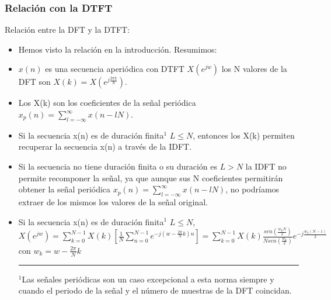 \begin{frame}
\frametitle{Relación con la DTFT}

\footnotesize

\alert{Relación entre la DFT y la DTFT:}

\begin{itemize}
\footnotesize
\item Hemos visto la relación en la introducción. Resumimos:
\item $x(n)$ es una secuencia aperiódica con DTFT $X(e^{jw})$ los N valores de la DFT son $X(k)=X(e^{j\frac{2\pi k}{N}})$.

\item Los X(k) son los coeficientes de la señal periódica $x_p(n)=\sum_{l=-\infty}^{\infty} x(n-lN)$.

\item Si la secuencia x(n) es de duración finita$^{1}$ $L\le N$, entonces los X(k) permiten recuperar la secuencia x(n) a través de la IDFT.

\item Si la secuencia no tiene duración finita o su duración es $L>N$ la IDFT no permite recomponer la señal, ya que aunque sus N coeficientes permitirán obtener la señal periódica $x_p(n)=\sum_{l=-\infty}^{\infty} x(n-lN)$, no podríamos extraer de los mismos los valores de la señal original.

\item Si la secuencia x(n) es de duración finita$^{1}$ $L\le N$, $X(e^{jw})=\!\sum_{k=0}^{N-1} \!X(k)\! \left [\frac{1}{N}\sum_{n=0}^{N-1}e^{-j(w-\frac{2\pi}{N}k)n}\right ]= \!\sum_{k=0}^{N-1} \!X(k)\! \frac{sen(\frac{w_kN}{2})}{N sen(\frac{w_k}{2}) }e^{-j\frac{w_k(N-1)}{2}}$ con $w_k=w-\frac{2\pi}{N}k$

\vspace{-0.2cm}

\rule{11cm}{0.4pt}

 $^1$Las señales periódicas son un caso excepcional a esta norma siempre y cuando el periodo de la señal y el número de muestras de la DFT coincidan.

\end{itemize}


\end{frame}


